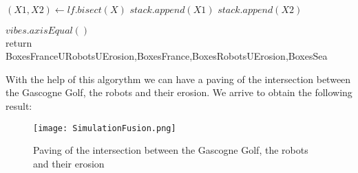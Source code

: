 \begin{algorithm}
\begin{algorithmic}
     	\ELSE
     
          			\STATE $(X1, X2)\gets lf.bisect(X)$
          			\STATE $stack.append(X1)$
         			\STATE $stack.append(X2)$
         		\ENDIF
         	
  		\ENDIF
 	 \ENDWHILE 
	
	\vspace{0.3 cm}
	
  \STATE $vibes.axisEqual()$\\
  return BoxesFranceURobotsUErosion,BoxesFrance,BoxesRobotsUErosion,BoxesSea


  \end{algorithmic}
\end{algorithm}

\vfill

\clearpage



\newpage

	With the help of this algorythm we can have a paving of the intersection between the Gascogne Golf, the robots and their erosion. We arrive to obtain the following result:
	

	
	\begin{figure}[!h] 
    \center
    	\texttt{[image: SimulationFusion.png]} 
    	\caption{Paving of the intersection between the Gascogne Golf, the robots and their erosion } 
    \label{S1 U S2}
	\end{figure} 